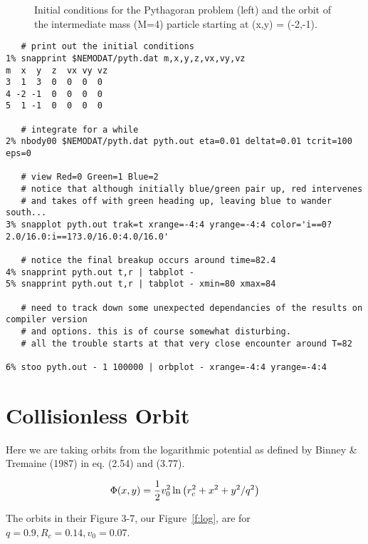 \begin{figure}[t]
\caption{Initial conditions for the Pythagoran problem (left)
and the orbit of the intermediate mass (M=4) particle starting
at (x,y) = (-2,-1).}
\end{figure}



\footnotesize\begin{verbatim}
   # print out the initial conditions
1% snapprint $NEMODAT/pyth.dat m,x,y,z,vx,vy,vz
m  x  y  z  vx vy vz
3  1  3  0  0  0  0
4 -2 -1  0  0  0  0
5  1 -1  0  0  0  0

   # integrate for a while
2% nbody00 $NEMODAT/pyth.dat pyth.out eta=0.01 deltat=0.01 tcrit=100 eps=0

   # view Red=0 Green=1 Blue=2
   # notice that although initially blue/green pair up, red intervenes
   # and takes off with green heading up, leaving blue to wander south...
3% snapplot pyth.out trak=t xrange=-4:4 yrange=-4:4 color='i==0?2.0/16.0:i==1?3.0/16.0:4.0/16.0'

   # notice the final breakup occurs around time=82.4
4% snapprint pyth.out t,r | tabplot -
5% snapprint pyth.out t,r | tabplot - xmin=80 xmax=84

   # need to track down some unexpected dependancies of the results on compiler version
   # and options. this is of course somewhat disturbing.
   # all the trouble starts at that very close encounter around T=82

6% stoo pyth.out - 1 100000 | orbplot - xrange=-4:4 yrange=-4:4 
\end{verbatim}\normalsize


\section{Collisionless Orbit}

Here we are taking orbits from the logarithmic potential as defined
by Binney \& Tremaine (1987) in eq. (2.54) and (3.77).

$$
   \Phi(x,y) = {1\over 2} v_0^2
                    \ln{ \left( r_c^2 + x^2  + y^2/q^2 \right) }
$$

The orbits in their Figure 3-7, our Figure~\ref{f:log}, are for
$q=0.9, R_c=0.14, v_0=0.07$.

